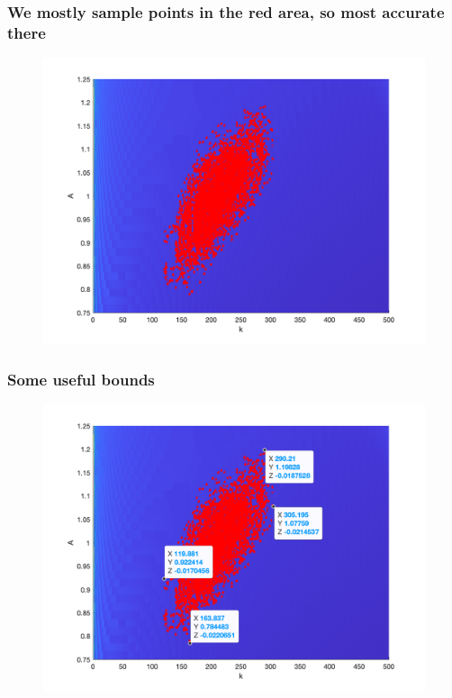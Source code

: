 \documentclass{beamer}
\begin{document}
\begin{frame}
\frametitle[alignment=center]{We mostly sample points in the red area, so most accurate there}
\begin{figure}
\centering
\includegraphics[scale=0.25]{Fig5.png}
\end{figure}
\end{frame}

\begin{frame}
\frametitle[alignment=center]{Some useful bounds}
\begin{figure}
\centering
\includegraphics[scale=0.25]{Fig6.png}
\end{figure}
\end{frame}
\end{document}
